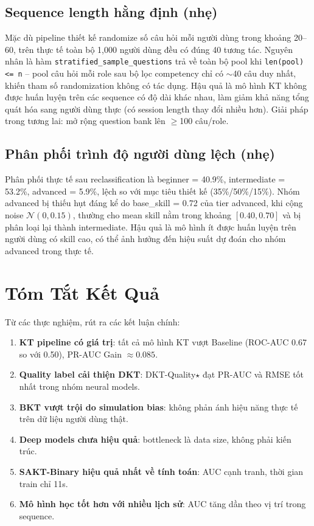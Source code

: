 \documentclass[12pt, a4paper]{report}
\begin{document}
\subsection{Sequence length hằng định (nhẹ)}
Mặc dù pipeline thiết kế randomize số câu hỏi mỗi người dùng trong khoảng 20--60, trên thực tế toàn bộ 1{,}000 người dùng đều có đúng 40 tương tác. Nguyên nhân là hàm \texttt{stratified\_sample\_questions} trả về toàn bộ pool khi \texttt{len(pool) <= n} -- pool câu hỏi mỗi role sau bộ lọc competency chỉ có $\sim$40 câu duy nhất, khiến tham số randomization không có tác dụng. Hậu quả là mô hình KT không được huấn luyện trên các sequence có độ dài khác nhau, làm giảm khả năng tổng quát hóa sang người dùng thực (có session length thay đổi nhiều hơn). Giải pháp trong tương lai: mở rộng question bank lên $\geq$100 câu/role.

\subsection{Phân phối trình độ người dùng lệch (nhẹ)}
Phân phối thực tế sau reclassification là beginner = 40.9\%, intermediate = 53.2\%, advanced = 5.9\%, lệch so với mục tiêu thiết kế (35\%/50\%/15\%). Nhóm advanced bị thiếu hụt đáng kể do base\_skill = 0.72 của tier advanced, khi cộng noise $\mathcal{N}(0, 0.15)$, thường cho mean skill nằm trong khoảng $[0.40, 0.70]$ và bị phân loại lại thành intermediate. Hậu quả là mô hình ít được huấn luyện trên người dùng có skill cao, có thể ảnh hưởng đến hiệu suất dự đoán cho nhóm advanced trong thực tế.

\section{Tóm Tắt Kết Quả}
\label{sec:summary}

Từ các thực nghiệm, rút ra các kết luận chính:

\begin{enumerate}
  \item \textbf{KT pipeline có giá trị}: tất cả mô hình KT vượt Baseline (ROC-AUC 0.67 so với 0.50), PR-AUC Gain $\approx 0.085$.
  \item \textbf{Quality label cải thiện DKT}: DKT-Quality$\star$ đạt PR-AUC và RMSE tốt nhất trong nhóm neural models.
  \item \textbf{BKT vượt trội do simulation bias}: không phản ánh hiệu năng thực tế trên dữ liệu người dùng thật.
  \item \textbf{Deep models chưa hiệu quả}: bottleneck là data size, không phải kiến trúc.
  \item \textbf{SAKT-Binary hiệu quả nhất về tính toán}: AUC cạnh tranh, thời gian train chỉ 11s.
  \item \textbf{Mô hình học tốt hơn với nhiều lịch sử}: AUC tăng dần theo vị trí trong sequence.
\end{enumerate}
\end{document}
